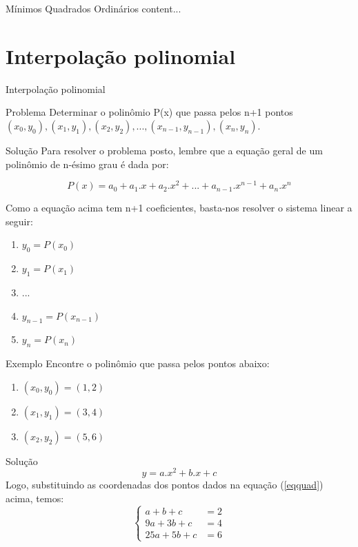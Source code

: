 \documentclass{beamer}
\begin{document}
	\begin{frame}{Mínimos Quadrados Ordinários}
		content...
	\end{frame}
	\section{Interpolação polinomial}
	
	\begin{frame}{Interpolação polinomial}
		\begin{block}{Problema}
			Determinar o polinômio P(x) que passa pelos n+1 pontos $(x_0,y_0), (x_1,y_1), (x_2,y_2), ..., (x_{n-1},y_{n-1}), (x_n,y_n)$.
		\end{block}
	\end{frame}
	
	\begin{frame}{Solução}
		Para resolver o problema posto, lembre que a equação geral de um polinômio de n-ésimo grau é dada por:
		
		\begin{equation*}
		P(x)=a_0 + a_1 . x + a_2 . x^2 + ... + a_{n-1} . x^{n-1} + a_n . x^n
		\end{equation*}
		
		Como a equação acima tem  n+1 coeficientes, basta-nos  resolver o sistema linear a seguir:
		
		\begin{enumerate}
			\item $y_0 = P(x_0)$
			\item $y_1 = P(x_1)$
			\item ...
			\item $y_{n-1} = P(x_{n-1})$
			\item $y_n = P(x_n)$
		\end{enumerate}
	\end{frame}
	
	\begin{frame}{Exemplo}
		Encontre o polinômio que passa pelos pontos abaixo:
		\begin{enumerate}
			\item $(x_0,y_0)=(1,2)$
			\item $(x_1,y_1)=(3,4)$
			\item $(x_2,y_2)=(5,6)$
		\end{enumerate}
	\end{frame}
	
	
	
	
	\begin{frame}{Solução}
		\begin{equation}\label{eqquad}
		y=a.x^2+b.x+c
		\end{equation}
		Logo, substituindo as coordenadas dos pontos dados na equação (\ref{eqquad}) acima, temos:
		\begin{displaymath}\left\{
		\begin{array}{lr}
		a+b+c & = 2 \\
		9a+3b+c & = 4 \\
		25a+5b+c & = 6
		\end{array}
		\right.
		\end{displaymath}
	\end{frame}
	
\end{document}
